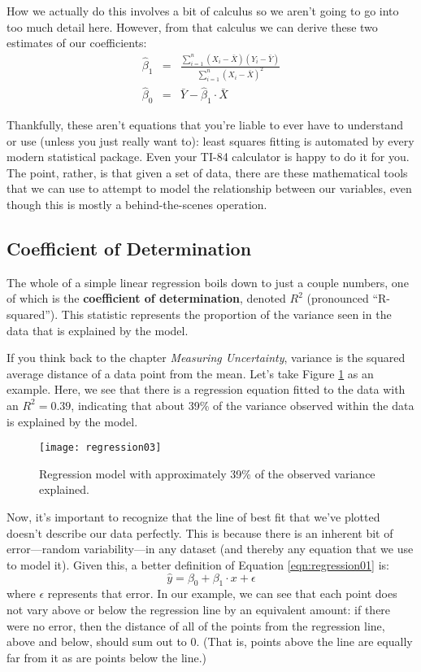 How we actually do this involves a bit of calculus so we aren't going to go into too much detail here. However, from that calculus we can derive these two estimates of our coefficients:
\begin{eqnarray*}
\hat{\beta}_1 &=& \frac{\sum_{i=1}^n\left(X_i-\bar{X}\right)\left(Y_i-\bar{Y}\right)}{\sum_{i=1}^n\left(X_i-\bar{X}\right)^2}\\
\hat{\beta}_0 &=& \bar{Y}-\hat{\beta}_1\cdot \bar{X}
\end{eqnarray*}

Thankfully, these aren't equations that you're liable to ever have to understand or use (unless you just really want to): least squares fitting is automated by every modern statistical package. Even your TI-84 calculator is happy to do it for you. The point, rather, is that given a set of data, there are these mathematical tools that we can use to attempt to model the relationship between our variables, even though this is mostly a behind-the-scenes operation.

\subsection{Coefficient of Determination}

The whole of a simple linear regression boils down to just a couple numbers, one of which is the \textbf{coefficient of determination}, denoted $R^2$ (pronounced ``R-squared''). This statistic represents the proportion of the variance seen in the data that is explained by the model.

If you think back to the chapter \textit{Measuring Uncertainty}, variance is the squared average distance of a data point from the mean. Let's take Figure \ref{fig:regression03} as an example. Here, we see that there is a regression equation fitted to the data with an $R^2=0.39$, indicating that about 39\% of the variance observed within the data is explained by the model.

\begin{figure}[h]
\texttt{[image: regression03]}
\label{fig:regression03}
\caption{Regression model with approximately 39\% of the observed variance explained.}
\end{figure}

Now, it's important to recognize that the line of best fit that we've plotted doesn't describe our data perfectly. This is because there is an inherent bit of error---random variability---in any dataset (and thereby any equation that we use to model it). Given this, a better definition of Equation \ref{eqn:regression01} is:
\begin{equation}
\hat{y} = \beta_0 + \beta_1\cdot x+\epsilon
\label{eqn:regression02}
\end{equation}
where $\epsilon$ represents that error. In our example, we can see that each point does not vary above or below the regression line by an equivalent amount: if there were no error, then the distance of all of the points from the regression line, above and below, should sum out to 0. (That is, points above the line are equally far from it as are points below the line.)

